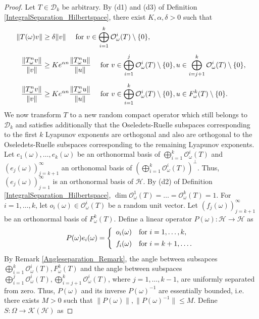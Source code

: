 \documentclass[pdflatex,sn-mathphys-num]{sn-jnl}%
\theoremstyle{thmstyleone}%
\theoremstyle{thmstyletwo}%
\theoremstyle{thmstylethree}%
\newcommand{\cH}{\mathcal{H}}
\newcommand{\cK}{\mathcal{K}}
\newcommand{\cO}{\mathcal{O}}
\numberwithin{equation}{section}
\begin{document}
\begin{proof}
Let $T\in\mathcal D_k$ be arbitrary.  By (d1) and (d3) of Definition \ref{IntegralSeparation_Hilbertspace}, there exist $K,\alpha,\delta>0$ such that 
\begin{align}
\|T(\omega)v\|& \geq \delta \|v\|
\quad \hbox{ for } v\in \bigoplus_{i=1}^{k} \mathcal O^i_{\omega}(T)\setminus\{0\},\label{Angleseparation_Eq1_New_Part2}\\[1ex]
\frac{\|T_{\omega}^n v\|}{\|v\|}
& \geq K e^{\alpha n}
    \frac{\|T_{\omega}^n u\|}{\|u\|}
\quad \hbox{ for } v\in \bigoplus_{i=1}^{j} \mathcal O^i_{\omega}(T)\setminus\{0\}, u\in \bigoplus_{i=j+1}^{k} \mathcal O^i_{\omega}(T)\setminus\{0\},\label{Integralseparation_New_Part2}\\[1ex]
\frac{\|T_{\omega}^n v\|}{\|v\|}
& \geq K e^{\alpha n}
    \frac{\|T_{\omega}^n u\|}{\|u\|}
\quad \hbox{ for } v\in \bigoplus_{i=1}^{k} \mathcal O^i_{\omega}(T)\setminus\{0\}, u\in F^{k}_{\omega}(T)\setminus\{0\}.\label{Speedseparation_New_Part2}
\end{align}
We now transform $T$ to a new random compact operator which still belongs to $\mathcal D_k$ and satisfies additionally that the Oseledets-Ruelle subspaces corresponding to the first $k$ Lyapunov exponents are orthogonal and also are orthogonal to the Oseledets-Ruelle subspaces corresponding to the remaining Lyapunov exponents. Let $e_{1}(\omega),\dots,e_{k}(\omega) $ be an orthonormal basis of $\bigoplus_{i=1}^k{\mathcal O}^i_{\omega}(T)$ and $\left(e_j(\omega)\right)_{j=k+1}^{\infty}$ an orthonomal basis of $\left(\bigoplus_{i=1}^k{\mathcal O}^i_{\omega}(T)\right)^{\perp}$. Thus, $\left(e_j(\omega)\right)_{j=1}^{\infty}$ is an orthonormal basis of $\cH$.
%
By (d2) of Definition \ref{IntegralSeparation_Hilbertspace}, $\dim \cO^1_{\omega}(T)=\dots=\cO^k_{\omega}(T)=1$.  For $i=1,\dots,k$, let $o_i(\omega)\in {\mathcal O}^i_{\omega}(T)$ be a random unit vector. Let $\left(f_j(\omega)\right)_{j=k+1}^{\infty}$ be an orthonormal basis of $F_{\omega}^k(T)$. Define a linear operator $P(\omega):\cH\rightarrow \cH$ as 
\begin{equation}\label{Transformation_Bounded}
P(\omega)e_i(\omega)
=
\left\{
\begin{array}{ll}
o_i(\omega) & \hbox{for } i=1,\dots,k,\\ [1ex]
f_i(\omega) & \hbox{for } i=k+1,\dots.
\end{array}
\right.
\end{equation}
By Remark \ref{Angleseparation_Remark},  the angle between subsapces $\bigoplus_{i=1}^k\mathcal O^i_{\omega}(T), F^k_{\omega}(T)$ and the angle between subspaces $\bigoplus_{i=1}^j\mathcal O^i_{\omega}(T), \bigoplus_{i=j+1}^k\mathcal O^i_{\omega}(T)$, where $j=1,\dots,k-1$, are uniformly separated from zero. Thus, $P(\omega)$ and its inverse $P(\omega)^{-1}$ are essentially bounded, i.e. there exists $M>0$ such that $\|P(\omega)\|, \|P(\omega)^{-1}\|\leq M$. Define $S:\Omega\rightarrow \cK(\cH)$ as 

\end{proof}
\end{document}
